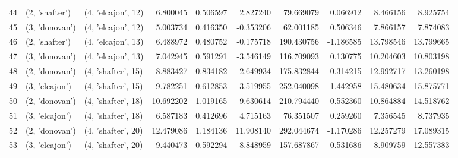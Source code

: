 \begin{tabular}{lllrrrrrrr}
44 &   (2, 'shafter') &  (4, 'elcajon', 12) &   6.800045 &   0.506597 &   2.827240 &   79.669079 &  0.066912 &   8.466156 &   8.925754 \\
45 &   (3, 'donovan') &  (4, 'elcajon', 12) &   5.003734 &   0.416350 &  -0.353206 &   62.001185 &  0.506346 &   7.866157 &   7.874083 \\
46 &   (2, 'shafter') &  (4, 'elcajon', 13) &   6.488972 &   0.480752 &  -0.175718 &  190.430756 & -1.186585 &  13.798546 &  13.799665 \\
47 &   (3, 'donovan') &  (4, 'elcajon', 13) &   7.042945 &   0.591291 &  -3.546149 &  116.709093 &  0.130775 &  10.204603 &  10.803198 \\
48 &   (2, 'donovan') &  (4, 'shafter', 15) &   8.883427 &   0.834182 &   2.649934 &  175.832844 & -0.314215 &  12.992717 &  13.260198 \\
49 &   (3, 'elcajon') &  (4, 'shafter', 15) &   9.782251 &   0.612853 &  -3.519955 &  252.040098 & -1.442958 &  15.480634 &  15.875771 \\
50 &   (2, 'donovan') &  (4, 'shafter', 18) &  10.692202 &   1.019165 &   9.630614 &  210.794440 & -0.552360 &  10.864884 &  14.518762 \\
51 &   (3, 'elcajon') &  (4, 'shafter', 18) &   6.587183 &   0.412696 &   4.715163 &   76.351507 &  0.259260 &   7.356545 &   8.737935 \\
52 &   (2, 'donovan') &  (4, 'shafter', 20) &  12.479086 &   1.184136 &  11.908140 &  292.044674 & -1.170286 &  12.257279 &  17.089315 \\
53 &   (3, 'elcajon') &  (4, 'shafter', 20) &   9.440473 &   0.592294 &   8.848959 &  157.687867 & -0.531686 &   8.909759 &  12.557383 \\
\bottomrule
\end{tabular}
